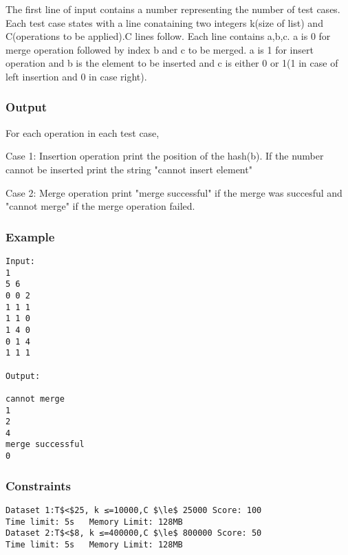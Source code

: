    The first line of input contains a number representing the number of test cases. Each test case states with a line conataining two integers k(size of list) and C(operations to be applied).C lines follow. Each line contains a,b,c. a is 0 for merge operation followed by index b and c to be merged. a is 1 for insert operation and b is the element to be inserted and c is either 0 or 1(1 in case of left insertion and 0 in case right).  

\subsubsection{   Output  }

   For each operation in each test case,  

   Case 1: Insertion operation print the position of the hash(b). If the number cannot be inserted print the string "cannot insert element"  

   Case 2: Merge operation print "merge successful" if the merge was succesful and "cannot merge" if the merge operation failed.  

\subsubsection{   Example  }
\begin{verbatim}
Input:
1
5 6
0 0 2
1 1 1
1 1 0
1 4 0
0 1 4
1 1 1 

Output:

cannot merge
1
2
4
merge successful
0
\end{verbatim}

\subsubsection{   Constraints  }
\begin{verbatim}
Dataset 1:T$<$25, k ≤=10000,C $\le$ 25000 Score: 100
Time limit: 5s   Memory Limit: 128MB
Dataset 2:T$<$8, k ≤=400000,C $\le$ 800000 Score: 50
Time limit: 5s   Memory Limit: 128MB 
\end{verbatim}

